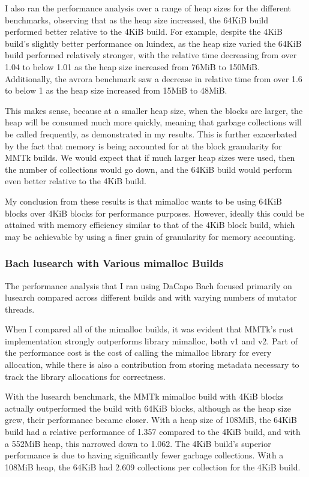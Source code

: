 \documentclass{article}
\begin{document}
I also ran the performance analysis over a range of heap sizes for the different benchmarks, observing that as the heap size increased, the 64KiB build performed better relative to the 4KiB build. For example, despite the 4KiB build's slightly better performance on luindex, as the heap size varied the 64KiB build performed relatively stronger, with the relative time decreasing from over 1.04 to below 1.01 as the heap size increased from 76MiB to 150MiB. Additionally, the avrora benchmark saw a decrease in relative time from over 1.6 to below 1 as the heap size increased from 15MiB to 48MiB.

This makes sense, because at a smaller heap size, when the blocks are larger, the heap will be consumed much more quickly, meaning that garbage collections will be called frequently, as demonstrated in my results. This is further exacerbated by the fact that memory is being accounted for at the block granularity for MMTk builds. We would expect that if much larger heap sizes were used, then the number of collections would go down, and the 64KiB build would perform even better relative to the 4KiB build.

My conclusion from these results is that mimalloc wants to be using 64KiB blocks over 4KiB blocks for performance purposes. However, ideally this could be attained with memory efficiency similar to that of the 4KiB block build, which may be achievable by using a finer grain of granularity for memory accounting.

\subsubsection{Bach lusearch with Various mimalloc Builds}
The performance analysis that I ran using DaCapo Bach focused primarily on lusearch compared across different builds and with varying numbers of mutator threads.

When I compared all of the mimalloc builds, it was evident that MMTk's rust implementation strongly outperforms library mimalloc, both v1 and v2. Part of the performance cost is the cost of calling the mimalloc library for every allocation, while there is also a contribution from storing metadata necessary to track the library allocations for correctness.

With the lusearch benchmark, the MMTk mimalloc build with 4KiB blocks actually outperformed the build with 64KiB blocks, although as the heap size grew, their performance became closer. With a heap size of 108MiB, the 64KiB build had a relative performance of 1.357 compared to the 4KiB build, and with a 552MiB heap, this narrowed down to 1.062. The 4KiB build's superior performance is due to having significantly fewer garbage collections. With a 108MiB heap, the 64KiB had 2.609 collections per collection for the 4KiB build.
\end{document}
